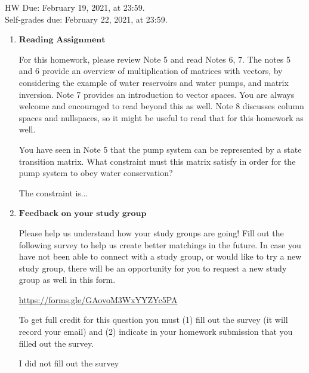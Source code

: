 \documentclass[11pt]{article}
\begin{document}
\maketitle
\fontsize{12}{15}\selectfont

\begin{center}
	HW Due: February 19, 2021, at 23:59. \\
	Self-grades due: February 22, 2021, at 23:59.
\end{center}

\begin{enumerate}
	\item $\textbf{Reading Assignment}$
	      	              
	      For this homework, please review Note 5 and read Notes 6, 7. The notes 5 and 6 provide an overview of multiplication of matrices with vectors, by considering the example of water reservoirs and water pumps, and matrix inversion. Note 7 provides an introduction to vector spaces. You are always welcome and encouraged to read beyond this as well. Note 8 discusses column spaces and nullspaces, so it might be useful to read that for this homework as well.
	      	              
	      You have seen in Note 5 that the pump system can be represented by a state transition matrix. What constraint must this matrix satisfy in order for the pump system to obey water conservation?
	      \begin{Answer}
	      	The constraint is...
	      \end{Answer}
	      	      
	      	      
	      \newpage
	\item $\textbf{Feedback on your study group}$
	      	         
	      Please help us understand how your study groups are going! Fill out the following survey to help us create better matchings in the future. In case you have not been able to connect with a study group, or would like to try a new study group, there will be an opportunity for you to request a new study group as well in this form.
	      	             
	      \href{https://forms.gle/GAovoM3WxYYZYc5PA}{https://forms.gle/GAovoM3WxYYZYc5PA}
	      	             
	      To get full credit for this question you must (1) fill out the survey (it will record your email) and (2) indicate in your homework submission that you filled out the survey.
	      \begin{Answer}
	      	I did not fill out the survey
	      \end{Answer}
	      	             

\end{enumerate}
\end{document}
